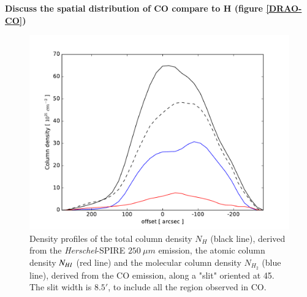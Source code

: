 \documentclass[traditabstract]{aa}
\begin{document}
\textbf{Discuss the spatial distribution of CO compare to H (figure \ref{DRAO-CO})}

\begin{figure}[h!]
  \centering
  \includegraphics[width=\linewidth,trim=30 10 55 35,clip=true]{Figures/Column_density_profiles.pdf}
  \caption{\label{Col_density} Density profiles of the total column density $N_H$ (black line), derived from the \emph{Herschel}-SPIRE $250\: \mu m$ emission, the atomic column density $N_{H\rmnum{1}}$ (red line) and the molecular column density $N_{H_2}$ (blue line), derived from the CO emission, along a "slit" oriented at 45\degree. The slit width is $8.5'$, to include all the region observed in CO.}
\end{figure}
\end{document}
